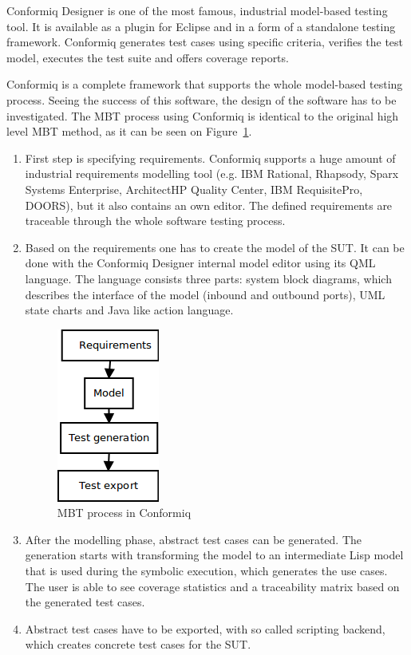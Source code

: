 Conformiq Designer \cite{conformiq}\cite{conformiqweb} is one of the most famous, industrial model-based testing tool. It is available as a plugin for Eclipse and in a form of a standalone testing framework. Conformiq generates test cases using specific criteria, verifies the test model, executes the test suite and offers coverage reports.

Conformiq is a complete framework that supports the whole model-based testing process. Seeing the success of this software, the design of the software has to be investigated. The MBT process using Conformiq is identical to the original high level MBT method, as it can be seen on Figure~\ref{fig:conformiq_process}.

\begin{enumerate}
	\item First step is specifying requirements. Conformiq supports a huge amount of industrial requirements modelling tool (e.g. IBM Rational, Rhapsody, Sparx Systems Enterprise, ArchitectHP Quality Center, IBM RequisitePro, DOORS), but it also contains an own editor. The defined requirements are traceable through the whole software testing process.
	\item Based on the requirements one has to create the model of the SUT. It can be done with the Conformiq Designer internal model editor using its QML language. The language consists three parts: system block diagrams, which describes the interface of the model (inbound and outbound ports), UML state charts and Java like action language.
	
\begin{figure}[htp]
\centering
\includegraphics[scale=0.6]{figures/conformiq_process.png}
\caption{MBT process in Conformiq}
\label{fig:conformiq_process}
\end{figure}
	
	\item After the modelling phase, abstract test cases can be generated. The generation starts with transforming the model to an intermediate Lisp model that is used during the symbolic execution, which generates the use cases. The user is able to see coverage statistics and a traceability matrix based on the generated test cases.
	\item Abstract test cases have to be exported, with so called scripting backend, which creates concrete test cases for the SUT.
\end{enumerate}


